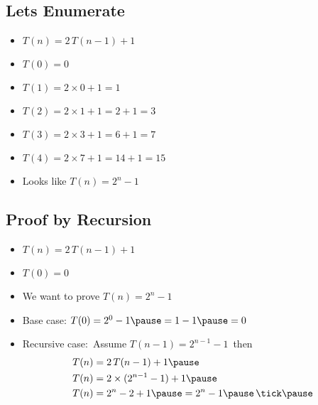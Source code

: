 
\begin{slide}
\section{Lets Enumerate}

\begin{itemize}\squeeze
\item $T(n) = 2\,T(n-1) + 1$\pause
\item $T(0) = 0$\pause
\item $T(1) = 2\times0 + 1 = 1$\pause
\item $T(2) = 2\times1 + 1 = 2+1 = 3$\pause
\item $T(3) = 2\times3 + 1 = 6+1 = 7$\pause
\item $T(4) = 2\times7 + 1 = 14+1 = 15$\pause
\item Looks like $T(n) = 2^n-1$\pause
\end{itemize}
\end{slide}


\begin{slide}
\section{Proof by Recursion}

\begin{itemize}
\item $T(n) = 2\,T(n-1) + 1$
\item $T(0) = 0$\pause
\item We want to prove $T(n) = 2^n-1$\pause
\item Base case: $T(0) = 2^0-1\pause=1-1\pause=0$\pause\,\tick\pause
\item Recursive case:\pause\ Assume $T(n-1) = 2^{n-1}-1$\pause\ then
  \begin{align*}
    T(n) &= 2\,T(n-1) + 1\pause\\
    T(n) &= 2\times(2^{n-1}-1) + 1\pause\\
    T(n) &= 2^n - 2 + 1 \pause = 2^n - 1\pause\,\mbox{\tick}\pause
  \end{align*}
\end{itemize}
\end{slide}


